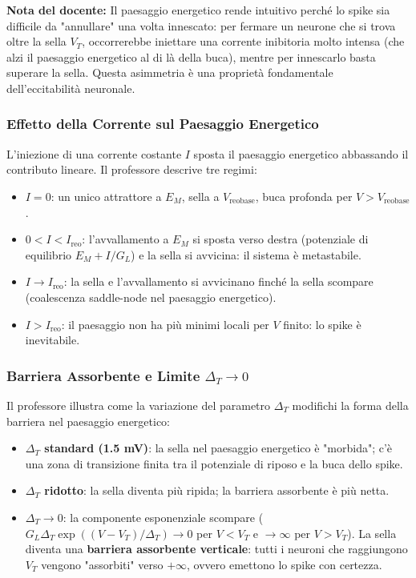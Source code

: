 \begin{tcolorbox}[colback=gray!5, colframe=gray!40, arc=2mm, boxrule=0.5pt]
\textbf{Nota del docente:} Il paesaggio energetico rende intuitivo perché lo spike sia difficile da "annullare" una volta innescato: per fermare un neurone che si trova oltre la sella $V_T$, occorrerebbe iniettare una corrente inibitoria molto intensa (che alzi il paesaggio energetico al di là della buca), mentre per innescarlo basta superare la sella. Questa asimmetria è una proprietà fondamentale dell'eccitabilità neuronale.
\end{tcolorbox}

\subsubsection{Effetto della Corrente sul Paesaggio Energetico}

L'iniezione di una corrente costante $I$ sposta il paesaggio energetico abbassando il contributo lineare. Il professore descrive tre regimi:
\begin{itemize}
    \item \textbf{$I = 0$}: un unico attrattore a $E_M$, sella a $V_{\text{reobase}}$, buca profonda per $V > V_{\text{reobase}}$.
    \item \textbf{$0 < I < I_{\text{reo}}$}: l'avvallamento a $E_M$ si sposta verso destra (potenziale di equilibrio $E_M + I/G_L$) e la sella si avvicina: il sistema è metastabile.
    \item \textbf{$I \to I_{\text{reo}}$}: la sella e l'avvallamento si avvicinano finché la sella scompare (coalescenza saddle-node nel paesaggio energetico).
    \item \textbf{$I > I_{\text{reo}}$}: il paesaggio non ha più minimi locali per $V$ finito: lo spike è inevitabile.
\end{itemize}

\subsubsection{Barriera Assorbente e Limite $\Delta_T \to 0$}

Il professore illustra come la variazione del parametro $\Delta_T$ modifichi la forma della barriera nel paesaggio energetico:
\begin{itemize}
    \item \textbf{$\Delta_T$ standard (1.5 mV)}: la sella nel paesaggio energetico è "morbida"; c'è una zona di transizione finita tra il potenziale di riposo e la buca dello spike.
    \item \textbf{$\Delta_T$ ridotto}: la sella diventa più ripida; la barriera assorbente è più netta.
    \item \textbf{$\Delta_T \to 0$}: la componente esponenziale scompare ($G_L \Delta_T \exp((V - V_T)/\Delta_T) \to 0$ per $V < V_T$ e $\to \infty$ per $V > V_T$). La sella diventa una \textbf{barriera assorbente verticale}: tutti i neuroni che raggiungono $V_T$ vengono "assorbiti" verso $+\infty$, ovvero emettono lo spike con certezza.
\end{itemize}

